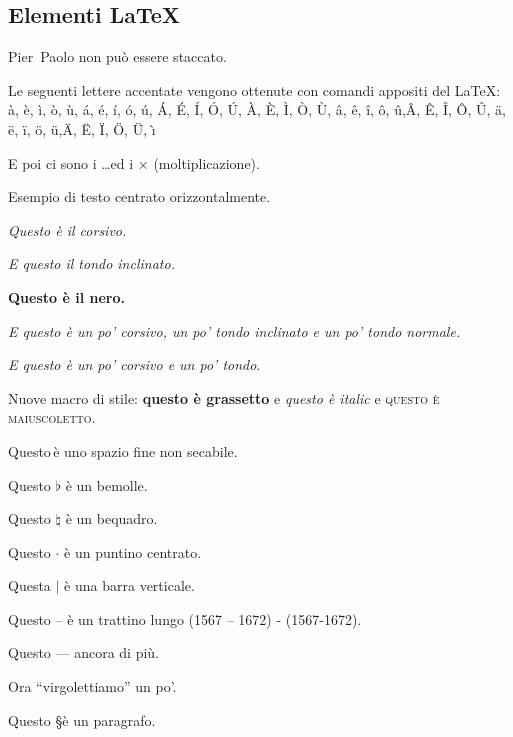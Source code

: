\documentclass[12pt]{book}
\begin{document}
\subsection{Elementi \LaTeX}
\par
Pier~Paolo non pu\`o essere staccato.
\par
Le seguenti lettere accentate vengono ottenute con comandi appositi del 
\LaTeX:
\`a, \`{e}, \`{i}, \`{o}, \`{u},
\'{a}, \'e, \'{i}, \'{o}, \'{u}, 
\'{A}, \'{E}, \'{I}, \'{O}, \'{U}, 
\`{A}, \`{E}, \`{I}, \`{O}, \`{U},
\^{a}, \^{e}, \^{i}, \^{o}, \^{u},\^{A}, \^{E}, \^{I}, \^{O}, \^{U}, 
\"{a}, \"{e}, \"{i}, \"{o}, \"{u},\"{A}, \"{E}, \"{I}, \"{O}, \"{U}, 
{\`\i}
\par
E poi ci sono i \dots ed i $\times$ (moltiplicazione).
\par
\cite{piripacchio}
\par
{}
\par
\begin{center}
Esempio di testo centrato orizzontalmente.
\end{center}
\par
{\it Questo {\`e} il corsivo.}
\par
{\sl E questo il tondo inclinato.}
\par
{\bf Questo {\`e} il nero.}
\par
{\it E questo {\rm {\`e} un po'} corsivo, un po'
{\sl  tondo inclinato} e {\rm un po' tondo normale}.}
\par
{\it E questo {\rm {\`e} un po'} corsivo
e un po' {\rm tondo}}.
\par
Nuove macro di stile: \textbf{questo è grassetto} e \textit{questo è italic} e \textsc{questo è maiuscoletto}.
\par
Questo\,{\`e} uno spazio fine non secabile.
\par
Questo $\flat$ {\`e} un bemolle.
\par
Questo $\natural$ {\`e} un bequadro.
\par
Questo $\cdot$ {\`e} un puntino centrato.
\par
Questa $\vert$ {\`e} una barra verticale.
\par
Questo -- {\`e} un trattino lungo (1567 -- 1672) - (1567-1672).
\par
Questo --- ancora di più.
\par
Ora ``virgolettiamo'' un po'.
\par
Questo \S {\`e} un paragrafo.
\par
{}
\par
\end{document}
